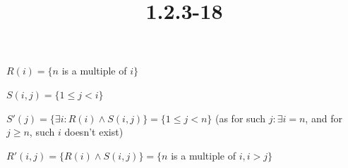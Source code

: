 \documentclass{article}
\title{1.2.3-18}
\begin{document}
\maketitle

\( R(i) = \{ n \) is a multiple of \( i \} \)

\( S(i,j) = \{ 1 \leq j < i \} \)

\( S'(j) = \{ \exists i: R(i) \land S(i,j) \} = \{ 1 \leq j < n \} \) (as for such \( j: \exists i = n \), and for \( j \geq n \), such \( i \) doesn't exist)

\( R'(i,j) = \{ R(i) \land S(i,j) \} = \{ n \) is a multiple of \( i, i > j \} \)
\end{document}
